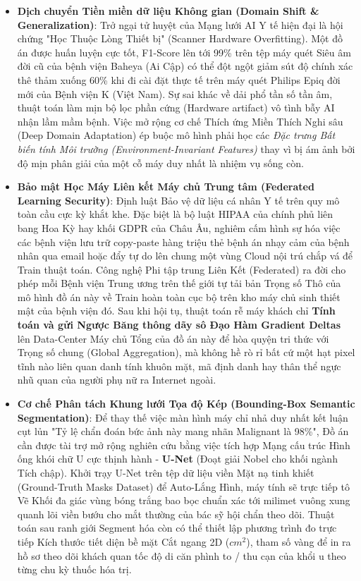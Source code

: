 \documentclass[conference,a4paper]{IEEEtran}
\begin{document}
\begin{itemize}
\item \textbf{Dịch chuyển Tiền miền dữ liệu Không gian (Domain Shift \& Generalization)}: Trở ngại tử huyệt của Mạng lưới AI Y tế hiện đại là hội chứng "Học Thuộc Lòng Thiết bị" (Scanner Hardware Overfitting). Một đồ án được huấn luyện cực tốt, F1-Score lên tới 99\% trên tệp máy quét Siêu âm đời cũ của bệnh viện Baheya (Ai Cập) có thể đột ngột giảm sút độ chính xác thê thảm xuống 60\% khi đi cài đặt thực tế trên máy quét Philips Epiq đời mới của Bệnh viện K (Việt Nam). Sự sai khác về dải phổ tần số tần âm, thuật toán làm mịn bộ lọc phần cứng (Hardware artifact) vô tình bẫy AI nhận lầm mầm bệnh. Việc mở rộng cơ chế Thích ứng Miền Thích Nghi sâu (Deep Domain Adaptation) ép buộc mô hình phải học các \textit{Đặc trưng Bất biến tính Môi trường (Environment-Invariant Features)} thay vì bị ám ảnh bởi độ mịn phân giải của một cỗ máy duy nhất là nhiệm vụ sống còn.
\item \textbf{Bảo mật Học Máy Liên kết Máy chủ Trung tâm (Federated Learning Security)}: Định luật Bảo vệ dữ liệu cá nhân Y tế trên quy mô toàn cầu cực kỳ khắt khe. Đặc biệt là bộ luật HIPAA của chính phủ liên bang Hoa Kỳ hay khối GDPR của Châu Âu, nghiêm cấm hình sự hóa việc các bệnh viện lưu trữ copy-paste hàng triệu thẻ bệnh án nhạy cảm của bệnh nhân qua email hoặc đẩy tự do lên chung một vùng Cloud nội trú chắp vá để Train thuật toán. Công nghệ Phi tập trung Liên Kết (Federated) ra đời cho phép mỗi Bệnh viện Trung ương trên thế giới tự tải bản Trọng số Thô của mô hình đồ án này về Train hoàn toàn cục bộ trên kho máy chủ sinh thiết mật của bệnh viện đó. Sau khi hội tụ, thuật toán rễ máy khách chỉ \textbf{Tính toán và gửi Ngược Băng thông dãy sô Đạo Hàm Gradient Deltas} lên Data-Center Máy chủ Tổng của đồ án này để hòa quyện tri thức với Trọng số chung (Global Aggregation), mà không hề rò rỉ bất cứ một hạt pixel tĩnh nào liên quan danh tính khuôn mặt, mã định danh hay thân thể ngực nhũ quan của người phụ nữ ra Internet ngoài.
\item \textbf{Cơ chế Phân tách Khung lưới Tọa độ Kép (Bounding-Box Semantic Segmentation)}: Để thay thế việc màn hình máy chỉ nhả duy nhất kết luận cụt lủn "Tỷ lệ chẩn đoán bức ảnh này mang nhãn Malignant là 98\%", Đồ án cần được tài trợ mở rộng nghiên cứu bằng việc tích hợp Mạng cấu trúc Hình ống khói chữ U cực thịnh hành - \textbf{U-Net} (Đoạt giải Nobel cho khối ngành Tích chập). Khởi τrạy U-Net trên tệp dữ liệu viền Mặt nạ tinh khiết (Ground-Truth Masks Dataset) để Auto-Lắng Hình, máy tính sẽ trực tiếp tô Vẽ Khối đa giác vùng bóng trắng bao bọc chuẩn xác tới milimet vuông xung quanh lõi viền bướu cho mắt thường của bác sỹ hội chẩn theo dõi. Thuật toán sau ranh giới Segment hóa còn có thể thiết lập phương trình đo trực tiếp Kích thước tiết diện bề mặt Cắt ngang 2D ($cm^2$), tham số vàng để in ra hồ sơ theo dõi khách quan tốc độ di căn phình to / thu cạn của khổi u theo từng chu kỳ thuốc hóa trị.

\end{itemize}
\end{document}
